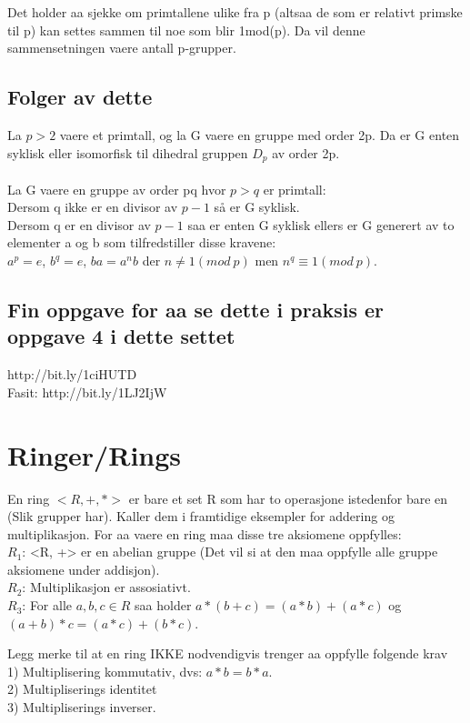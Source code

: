 \documentclass[12pt,a4paper]{article}
\begin{document}
Det holder aa sjekke om primtallene ulike fra p (altsaa de som er relativt primske til p) kan settes sammen til noe som blir 1mod(p). Da vil denne sammensetningen vaere antall p-grupper. 

\subsection*{Folger av dette}
La $p>2$ vaere et primtall, og la G vaere en gruppe med order 2p. Da er G enten syklisk eller isomorfisk til dihedral gruppen $D_p$ av order 2p.\\\\

La G vaere en gruppe av order pq hvor $p>q$ er primtall: \\
Dersom q ikke er en divisor av $p-1$ så er G syklisk. \\
Dersom q er en divisor av $p-1$ saa er enten G syklisk ellers er G generert av to elementer a og b som tilfredstiller disse kravene:\\
$a^p = e$, $b^q = e$, $ba = a^n b$ der $n \neq 1(mod\ p)$ men $n^q \equiv 1 (mod\ p)$.

\subsection*{Fin oppgave for aa se dette i praksis er oppgave 4 i dette settet}
http://bit.ly/1ciHUTD\\
Fasit:
http://bit.ly/1LJ2IjW


\section*{Ringer/Rings}
En ring $< R, +, * >$ er bare et set R som har to operasjone istedenfor bare en (Slik grupper har). Kaller dem i framtidige eksempler for addering og multiplikasjon. For aa vaere en ring maa disse tre aksiomene oppfylles:\\
$R_1$: <R, +> er en abelian gruppe (Det vil si at den maa oppfylle alle gruppe aksiomene under addisjon).\\
$R_2$: Multiplikasjon er assosiativt.\\
$R_3$: For alle $a,b,c \in R$ saa holder $a*(b+c) = (a*b) + (a*c)$ og $(a+b) * c = (a*c) + (b*c)$.

Legg merke til at en ring IKKE nodvendigvis trenger aa oppfylle folgende krav\\
1) Multiplisering kommutativ, dvs: $a*b = b*a$.\\
2) Multipliserings identitet\\
3) Multipliserings inverser.\\
\end{document}
